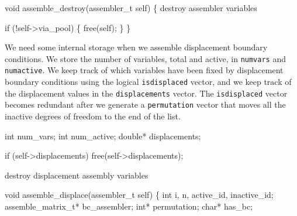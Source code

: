 \nwendcode{}\nwdocspar

\nwenddocs{}\plusendmoddef
void assemble_destroy(assembler_t self)
\{
    \LA{}destroy assembler variables~{\nwtagstyle{}}\RA{}

    if (!self->via_pool) \{
        free(self);
    \}
\}

\nwendcode{}\nwdocspar

We need some internal storage when we assemble displacement boundary
conditions.  We store the number of variables, total and active,
in {\tt{}num{}vars} and {\tt{}num{}active}.  We keep track of which variables
have been fixed by displacement boundary conditions using the
logical {\tt{}is{}displaced} vector, and we keep track of the
displacement values in the {\tt{}displacements} vector.  The
{\tt{}is{}displaced} vector becomes redundant after we generate
a {\tt{}permutation} vector that moves all the inactive degrees
of freedom to the end of the list.

\nwenddocs{}\plusendmoddef
int        num_vars;
int        num_active;
double*    displacements;
\nwendcode{}\nwdocspar

\nwenddocs{}\endmoddef
if (self->displacements) free(self->displacements);
\nwendcode{}\nwdocspar

\nwenddocs{}\endmoddef
\LA{}destroy displacement assembly variables~{\nwtagstyle{}}\RA{}
\nwendcode{}\nwdocspar

\nwenddocs{}\plusendmoddef
void assemble_displace(assembler_t self)
\{
    int i, n, active_id, inactive_id;
    assemble_matrix_t* bc_assembler;
    int*  permutation;
    char* has_bc;

